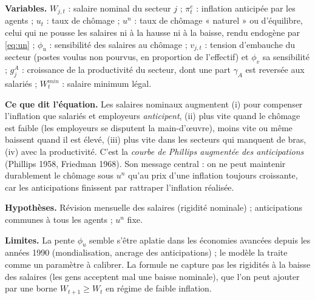 \documentclass[11pt,a4paper]{article}
\newcommand{\variables}{\par\noindent\textbf{Variables.} }
\newcommand{\sens}{\par\noindent\textbf{Ce que dit l'équation.} }
\newcommand{\hyp}{\par\noindent\textbf{Hypothèses.} }
\newcommand{\limites}{\par\noindent\textbf{Limites.} }
\begin{document}
\begin{lecture}
\variables $W_{j,t}$ : salaire nominal du secteur $j$ ; $\pi^e_t$ : inflation anticipée par les agents ; $u_t$ : taux de chômage ; $u^n$ : taux de chômage « naturel » ou d'équilibre, celui qui ne pousse les salaires ni à la hausse ni à la baisse, rendu endogène par \eqref{eq:un} ; $\phi_u$ : sensibilité des salaires au chômage ; $v_{j,t}$ : tension d'embauche du secteur (postes voulus non pourvus, en proportion de l'effectif) et $\phi_v$ sa sensibilité ; $g^A_j$ : croissance de la productivité du secteur, dont une part $\gamma_A$ est reversée aux salariés ; $W^{min}_t$ : salaire minimum légal.
\sens Les salaires nominaux augmentent (i) pour compenser l'inflation que salariés et employeurs \emph{anticipent}, (ii) plus vite quand le chômage est faible (les employeurs se disputent la main-d'œuvre), moins vite ou même baissent quand il est élevé, (iii) plus vite dans les secteurs qui manquent de bras, (iv) avec la productivité. C'est la \emph{courbe de Phillips augmentée des anticipations} (Phillips 1958, Friedman 1968). Son message central : on ne peut maintenir durablement le chômage sous $u^n$ qu'au prix d'une inflation toujours croissante, car les anticipations finissent par rattraper l'inflation réalisée.
\hyp Révision mensuelle des salaires (rigidité nominale) ; anticipations communes à tous les agents ; $u^n$ fixe.
\limites La pente $\phi_u$ semble s'être aplatie dans les économies avancées depuis les années 1990 (mondialisation, ancrage des anticipations) ; le modèle la traite comme un paramètre à calibrer. La formule ne capture pas les rigidités à la baisse des salaires (les gens acceptent mal une baisse nominale), que l'on peut ajouter par une borne $W_{t+1}\ge W_t$ en régime de faible inflation.

\end{lecture}
\end{document}
